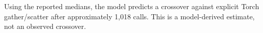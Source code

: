 Using the reported medians, the model predicts a crossover against explicit Torch gather/scatter after approximately 1,018 calls. This is a model-derived estimate, not an observed crossover.
